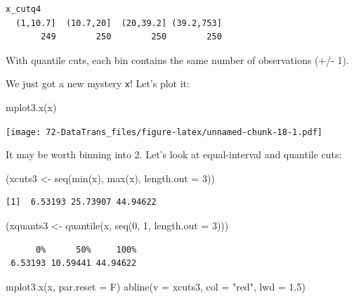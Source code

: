 \documentclass[
]{book}
\newenvironment{Shaded}{\begin{snugshade}}{\end{snugshade}}
\newcommand{\AttributeTok}[1]{\textcolor[rgb]{0.77,0.63,0.00}{#1}}
\newcommand{\DecValTok}[1]{\textcolor[rgb]{0.00,0.00,0.81}{#1}}
\newcommand{\FloatTok}[1]{\textcolor[rgb]{0.00,0.00,0.81}{#1}}
\newcommand{\FunctionTok}[1]{\textcolor[rgb]{0.00,0.00,0.00}{#1}}
\newcommand{\NormalTok}[1]{#1}
\newcommand{\OtherTok}[1]{\textcolor[rgb]{0.56,0.35,0.01}{#1}}
\newcommand{\StringTok}[1]{\textcolor[rgb]{0.31,0.60,0.02}{#1}}
\begin{document}
\begin{verbatim}
x_cutq4
  (1,10.7]  (10.7,20]  (20,39.2] (39.2,753] 
       249        250        250        250 
\end{verbatim}

With quantile cuts, each bin contains the same number of observations (+/- 1).

We just got a new mystery \texttt{x}! Let's plot it:

\begin{Shaded}
\begin{Highlighting}[]
\FunctionTok{mplot3.x}\NormalTok{(x)}
\end{Highlighting}
\end{Shaded}

\texttt{[image: 72-DataTrans\_files/figure-latex/unnamed-chunk-18-1.pdf]}

It may be worth binning into 2. Let's look at equal-interval and quantile cuts:

\begin{Shaded}
\begin{Highlighting}[]
\NormalTok{(xcuts3 }\OtherTok{\textless{}{-}} \FunctionTok{seq}\NormalTok{(}\FunctionTok{min}\NormalTok{(x), }\FunctionTok{max}\NormalTok{(x), }\AttributeTok{length.out =} \DecValTok{3}\NormalTok{))}
\end{Highlighting}
\end{Shaded}

\begin{verbatim}
[1]  6.53193 25.73907 44.94622
\end{verbatim}

\begin{Shaded}
\begin{Highlighting}[]
\NormalTok{(xquants3 }\OtherTok{\textless{}{-}} \FunctionTok{quantile}\NormalTok{(x, }\FunctionTok{seq}\NormalTok{(}\DecValTok{0}\NormalTok{, }\DecValTok{1}\NormalTok{, }\AttributeTok{length.out =} \DecValTok{3}\NormalTok{)))}
\end{Highlighting}
\end{Shaded}

\begin{verbatim}
      0%      50%     100% 
 6.53193 10.59441 44.94622 
\end{verbatim}

\begin{Shaded}
\begin{Highlighting}[]
\FunctionTok{mplot3.x}\NormalTok{(x, }\AttributeTok{par.reset =}\NormalTok{ F)}
\FunctionTok{abline}\NormalTok{(}\AttributeTok{v =}\NormalTok{ xcuts3, }\AttributeTok{col =} \StringTok{"red"}\NormalTok{, }\AttributeTok{lwd =} \FloatTok{1.5}\NormalTok{)}
\end{Highlighting}
\end{Shaded}
\end{document}
